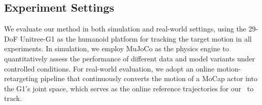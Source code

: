 \begin{table}[t]
  \centering
  \caption{
  Comparison of backbone architectures and scaling effects. 
  Larger datasets and higher-capacity Transformers consistently improve stability 
  and zero-shot tracking accuracy across all metrics.
  }
  \label{tab:sim_scaling_backbone}
\end{table}


\subsection{Experiment Settings}

We evaluate our method in both simulation and real-world settings, 
using the 29-DoF Unitree-G1 as the humanoid platform for tracking the target motion in all experiments. In simulation, we employ MuJoCo\citep{mujoco12} as the physics engine to quantitatively assess the performance of different data and model variants under controlled conditions. For real-world evaluation, we adopt an online motion-retargeting pipeline that continuously converts the motion of a MoCap actor into the G1’s joint space, which serves as the online reference trajectories for our \methodname\ to track. 

